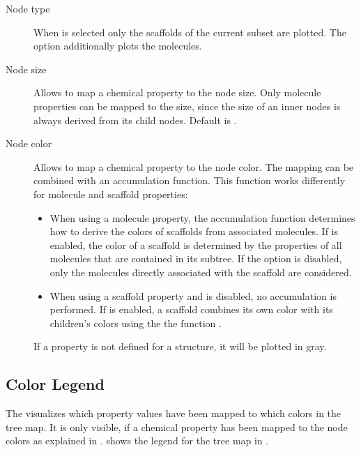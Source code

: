 \begin{description}
\item[Node type] When  is selected only the scaffolds of the current subset are plotted. The option  additionally plots the molecules.
\item[Node size] Allows to map a chemical property to the node size. Only molecule properties can be mapped to the size, since the size of an inner nodes is always derived from its child nodes. Default is .
\item[Node color] Allows to map a chemical property to the node color. The mapping can be combined with an accumulation function. This function works differently for molecule and scaffold properties:
\begin{itemize}
\item When using a molecule property, the accumulation function determines how to derive the colors of scaffolds from associated molecules. If  is enabled, the color of a scaffold is determined by the properties of all molecules that are contained in its subtree. If the option is disabled, only the molecules directly associated with the scaffold are considered.
\item When using a scaffold property and  is disabled, no accumulation is performed. If  is enabled, a scaffold combines its own color with its children's colors using the the function .
\end{itemize}
If a property is not defined for a structure, it will be plotted in gray. 
\end{description}

\subsection{Color Legend}

The  visualizes which property values have been mapped to which colors in the tree map. It is only visible, if a chemical property has been mapped to the node colors as explained in .  shows the legend for the tree map in .

